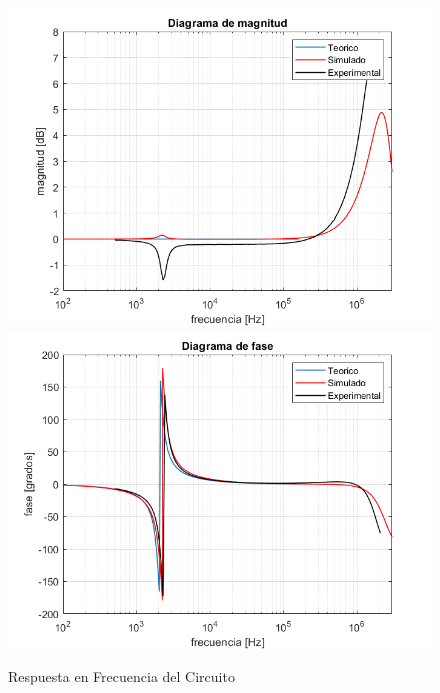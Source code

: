 \begin{figure}[H]
    \centering
    \includegraphics[scale = 0.7]{../Ejercicio1-FiltroConGIC/Informe/rfmag.png}
    \includegraphics[scale = 0.7]{../Ejercicio1-FiltroConGIC/Informe/rfpha.png}
    \caption{Respuesta en Frecuencia del Circuito}
    \label{ej1rf}
\end{figure}

